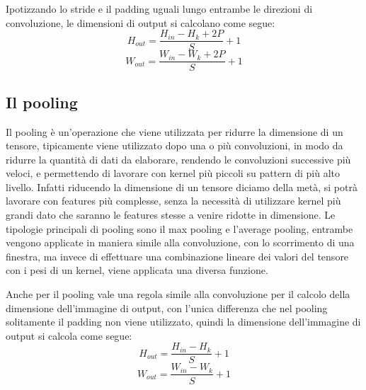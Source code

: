 Ipotizzando lo stride e il padding uguali lungo entrambe le direzioni di convoluzione, le dimensioni di output si calcolano come segue:
\begin{equation}
    \label{eq:convolution_output_size_h}
    H_{out} = \frac{H_{in} - H_{k} + 2P}{S} + 1
\end{equation}
\begin{equation}
    \label{eq:convolution_output_size_w}
    W_{out} = \frac{W_{in} - W_{k} + 2P}{S} + 1
\end{equation}

\subsection{Il pooling}
Il pooling è un'operazione che viene utilizzata per ridurre la dimensione di un tensore, tipicamente viene utilizzato dopo una o più convoluzioni,
in modo da ridurre la quantità di dati da elaborare, rendendo le convoluzioni successive più veloci, e permettendo di lavorare con kernel più piccoli
su pattern di più alto livello. Infatti riducendo la dimensione di un tensore diciamo della metà, si potrà lavorare con features più complesse,
senza la necessità di utilizzare kernel più grandi dato che saranno le features stesse a venire ridotte in dimensione.
Le tipologie principali di pooling sono il max pooling e l'average pooling, entrambe vengono applicate in maniera simile alla convoluzione,
con lo scorrimento di una finestra, ma invece di effettuare una combinazione lineare dei valori del tensore con i pesi di un kernel, 
viene applicata una diversa funzione.

Anche per il pooling vale una regola simile alla convoluzione per il calcolo della dimensione dell'immagine di output, con l'unica differenza che nel
pooling solitamente il padding non viene utilizzato, quindi la dimensione dell'immagine di output si calcola come segue:
\begin{equation}
    H_{out} = \frac{H_{in} - H_{k}}{S} + 1
\end{equation}
\begin{equation}
    W_{out} = \frac{W_{in} - W_{k}}{S} + 1
\end{equation}


